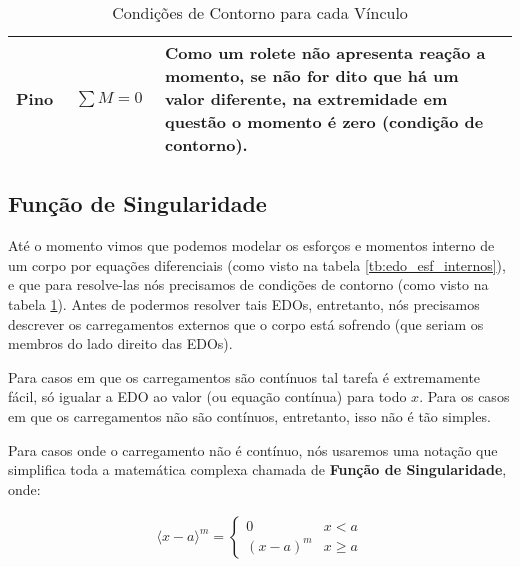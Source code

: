 \documentclass{article}
\begin{document}
\begin{table}[h]
\begin{tabular}{|l|c|l|}
                    Pino & 
                        \begin{minipage}{.4\textwidth}
                            \begin{align*}
                                \sum M = 0
                            \end{align*}
                        \end{minipage} &
                        
                        \begin{minipage}{.4\textwidth}
                            \vspace{5px}
                            Como um rolete não apresenta reação a momento, \textbf{se não for dito que há um valor diferente}, na extremidade em questão o momento é zero (condição de contorno).
                        \end{minipage} \\ \hline    
                \end{tabular}
                \caption{Condições de Contorno para cada Vínculo}
                \label{tb:cond_contorno}
            \end{table}

        \newpage
        \subsection{Função de Singularidade}
            Até o momento vimos que podemos modelar os esforços e momentos interno de um corpo por equações diferenciais (como visto na tabela \ref{tb:edo_esf_internos}), e que para resolve-las
            nós precisamos de condições de contorno (como visto na tabela \ref{tb:cond_contorno}). Antes de podermos resolver tais EDOs, entretanto, nós precisamos descrever os carregamentos
            externos que o corpo está sofrendo (que seriam os membros do lado direito das EDOs).

            Para casos em que os carregamentos são contínuos tal tarefa é extremamente fácil, só igualar a EDO ao valor (ou equação contínua) para todo $x$. Para os casos em que os carregamentos não são contínuos, entretanto, isso não é tão simples.

            Para casos onde o carregamento não é contínuo, nós usaremos uma notação que simplifica toda a matemática complexa chamada de \textbf{Função de Singularidade}, onde:

            \begin{align}
                \langle x - a\rangle^m = \begin{cases}
                    0          & x<a \\ 
                    (x-a)^m    & x \ge a
                \end{cases}
                \label{eq:func_singularidade}
            \end{align}
\end{document}

